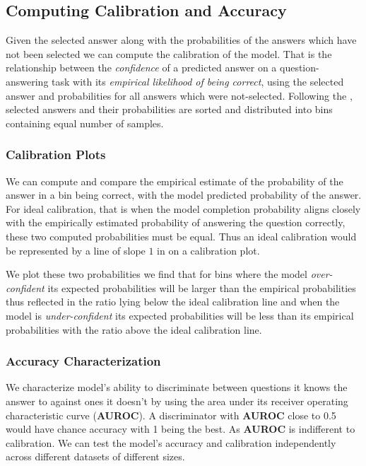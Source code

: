 \documentclass[11pt]{article}
\begin{document}
\subsection{Computing Calibration and Accuracy}

Given the selected answer along with the probabilities 
of the answers which have not been selected we can 
compute the calibration of the model.  That is the relationship 
between the \emph{confidence} of a predicted answer on a 
question-answering task with its \emph{empirical likelihood of being correct}, using the selected answer and probabilities for all answers which were not-selected. Following the \cite{kadavath2022language},  selected answers and their probabilities are sorted and distributed into bins containing equal number of samples.

\subsubsection{Calibration Plots}

We can compute and compare the  empirical estimate of the 
probability of the answer in a bin being correct, with the model 
predicted probability of the answer. For ideal calibration, that 
is when the model completion probability aligns closely with the empirically estimated probability of answering the question correctly, these  two computed probabilities must be equal. Thus an  ideal calibration would be represented by a line of slope $1$ in 
on a calibration plot.


We plot these two probabilities we find that for bins 
where the model \emph{over-confident} its expected 
probabilities will be larger than the empirical probabilities 
thus reflected in the ratio lying below the ideal calibration 
line and when the model is \emph{under-confident} its 
expected probabilities will be less than its empirical  
probabilities with the ratio above the 
ideal calibration line.

\subsubsection{Accuracy Characterization}

We characterize model's ability to discriminate between questions it 
knows the answer to against ones it doesn't  by using the area under 
its receiver operating characteristic curve (\textbf{AUROC}). 
A discriminator with \textbf{AUROC}  close to 0.5 would have 
chance accuracy with 1 being the best. As \textbf{AUROC} is 
indifferent to calibration. We can test the model's accuracy 
and calibration independently across different datasets of 
different sizes.
\end{document}
